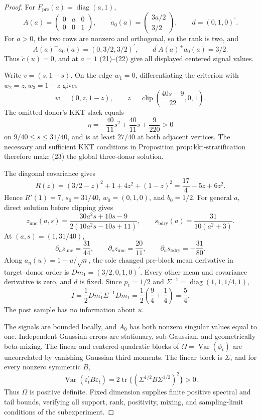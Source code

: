 \documentclass{article}
\begin{document}
\begin{proof}
For \(F_{\mathrm{pre}}(a)=\operatorname{diag}(a,1)\),
\[
 A(a)=\begin{pmatrix}0&a&0\\0&0&1\end{pmatrix},\qquad
 a_0(a)=\begin{pmatrix}3a/2\\3/2\end{pmatrix},\qquad
 d=(0,1,0)^\prime.
\tag{21}
\]
For \(a>0\), the two rows are nonzero and orthogonal, so the rank is two, and
\[
 A(a)^+a_0(a)=(0,3/2,3/2)^\prime,\qquad
 d^\prime A(a)^+a_0(a)=3/2.
\tag{22}
\]
Thus \(\dot c(u)=0\), and at \(a=1\) (21)--(22) give all displayed centered signal values.

Write \(v=(s,1-s)\).  On the edge \(w_1=0\), differentiating the criterion with \(w_2=z,w_3=1-z\) gives
\[
 w=(0,z,1-z),\qquad
 z=\operatorname{clip}\!\left(\frac{40s-9}{22},0,1\right).
\tag{23}
\]
The omitted donor's KKT slack equals
\[
 \eta=-\frac{40}{11}s^2+\frac{40}{11}s+\frac9{220}>0
\tag{24}
\]
on \(9/40\leq s\leq31/40\), and is at least \(27/40\) at both adjacent vertices.  The necessary and sufficient KKT conditions in Proposition \(\mathrm{prop:kkt\mbox{-}stratification}\) therefore make (23) the global three-donor solution.

The diagonal covariance gives
\[
 R(z)=(3/2-z)^2+1+4z^2+(1-z)^2
 =\frac{17}{4}-5z+6z^2.
\tag{25}
\]
Hence \(R'(1)=7\), \(s_0=31/40\), \(w_0=(0,1,0)\), and \(b_0=1/2\).  For general \(a\), direct solution before clipping gives
\[
 z_{\mathrm{unc}}(a,s)
 =\frac{30a^2s+10s-9}{2(10a^2s-10s+11)},\qquad
 s_{\mathrm{bdry}}(a)=\frac{31}{10(a^2+3)}.
\tag{26}
\]
At \((a,s)=(1,31/40)\),
\[
 \partial_a z_{\mathrm{unc}}=\frac{31}{44},\qquad
 \partial_s z_{\mathrm{unc}}=\frac{20}{11},\qquad
 \partial_a s_{\mathrm{bdry}}=-\frac{31}{80}.
\tag{27}
\]
Along \(a_n(u)=1+u/\sqrt n\), the sole changed pre-block mean derivative in target--donor order is \(Dm_1=(3/2,0,1,0)^\prime\).  Every other mean and covariance derivative is zero, and \(d\) is fixed.  Since \(p_1=1/2\) and \(\Sigma^{-1}=\operatorname{diag}(1,1,1/4,1)\),
\[
 I=\frac12Dm_1^\prime\Sigma^{-1}Dm_1
 =\frac12\left(\frac94+\frac14\right)=\frac54.
\tag{28}
\]
The post sample has no information about \(u\).

The signals are bounded locally, and \(A_0\) has both nonzero singular values equal to one.  Independent Gaussian errors are stationary, sub-Gaussian, and geometrically beta-mixing.  The linear and centered-quadratic blocks of \(\Omega=\operatorname{Var}(\phi_t)\) are uncorrelated by vanishing Gaussian third moments.  The linear block is \(\Sigma\), and for every nonzero symmetric \(B\),
\[
 \operatorname{Var}(\varepsilon_t^\prime B\varepsilon_t)
 =2\operatorname{tr}\{(\Sigma^{1/2}B\Sigma^{1/2})^2\}>0.
\tag{29}
\]
Thus \(\Omega\) is positive definite.  Fixed dimension supplies finite positive spectral and tail bounds, verifying all support, rank, positivity, mixing, and sampling-limit conditions of the subexperiment.


\end{proof}
\end{document}
